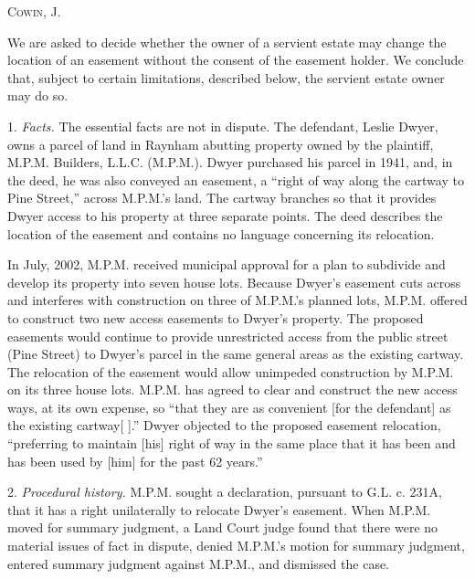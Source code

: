 

\opinion \textsc{Cowin}, J.

We are asked to decide whether the owner of a servient estate may change the
location of an easement without the consent of the easement holder. We conclude
that, subject to certain limitations, described below, the servient estate owner
may do so.

1. \textit{Facts.} The essential facts are not in dispute. The defendant, Leslie
Dwyer, owns a parcel of land in Raynham abutting property owned by the
plaintiff, M.P.M. Builders, L.L.C. (M.P.M.). Dwyer purchased his parcel in 1941,
and, in the deed, he was also conveyed an easement, a ``right of way along the
cartway to Pine Street,'' across M.P.M.'s land. The cartway branches so that it
provides Dwyer access to his property at three separate points. The deed
describes the location of the easement and contains no language concerning its
relocation.

In July, 2002, M.P.M. received municipal approval for a plan to subdivide and
develop its property into seven house lots. Because Dwyer's easement cuts across
and interferes with construction on three of M.P.M.'s planned lots, M.P.M.
offered to construct two new access easements to Dwyer's property. The proposed
easements would continue to provide unrestricted access from the public street
(Pine Street) to Dwyer's parcel in the same general areas as the existing
cartway. The relocation of the easement would allow unimpeded construction by
M.P.M. on its three house lots. M.P.M. has agreed to clear and construct the new
access ways, at its own expense, so ``that they are as convenient [for the
defendant] as the existing cartway[ ].'' Dwyer objected to the proposed easement
relocation, ``preferring to maintain [his] right of way in the same place that
it has been and has been used by [him] for the past 62 years.''

2. \textit{Procedural history.} M.P.M. sought a declaration, pursuant to G.L. c.
231A, that it has a right unilaterally to relocate Dwyer's easement. When M.P.M.
moved for summary judgment, a Land Court judge found that there were no material
issues of fact in dispute, denied M.P.M.'s motion for summary judgment, entered
summary judgment against M.P.M., and dismissed the case.

